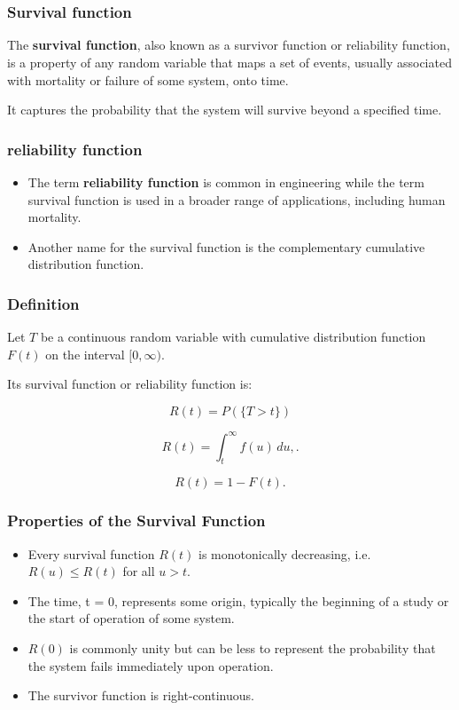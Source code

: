 \documentclass[]{beamer}
\begin{document}
\section{}
\begin{frame}
\frametitle{Survival function}
\Large
The \textbf{survival function}, also known as a survivor function or reliability function, is a property of 
any random variable that maps a set of events, usually associated with mortality or failure of 
some system, onto time. 

\vspace{0.3cm}
It captures the probability that the system will survive 
beyond a specified time.
\end{frame}
\begin{frame}
\frametitle{reliability function}\Large
\begin{itemize}
\item The term \textbf{reliability function} is common in engineering while the term survival function 
is used in a broader range of applications, including human mortality. 
\item Another name for the survival function is the complementary cumulative distribution function.
\end{itemize}
\end{frame}
\begin{frame}
\frametitle{Definition}
\Large
Let $T$ be a continuous random variable with cumulative distribution function $F(t)$ on the interval $[0,\infty)$. 

Its survival function or reliability function is:

\[R(t) = P(\{T > t\})\]

\[R(t) = \int_t^{\infty} f(u)\,du,.\]

\[R(t) =  1-F(t).\]

\end{frame}
\begin{frame}
\frametitle{Properties of the Survival Function}
\Large
\begin{itemize}
\item Every survival function $R(t)$ is monotonically decreasing, i.e. $R(u) \le R(t)$ for all $u > t$.
\item The time, t = 0, represents some origin, typically the beginning of a study or the start of operation of some system. 
\item $R(0)$ is commonly unity but can be less to represent the probability that the system fails immediately upon operation.
\item The survivor function is right-continuous.
\end{itemize}

\end{frame}
\end{document}
